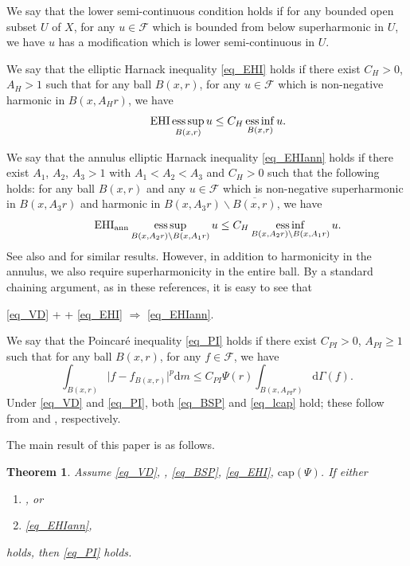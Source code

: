 \documentclass[11pt,a4paper]{article}
\numberwithin{equation}{section}
\newcommand{\esup}{\operatorname*{ess\,sup}}
\newcommand{\einf}{\operatorname*{ess\,inf}}
\theoremstyle{plain}
\newtheorem{theorem}{Theorem}[section]
\theoremstyle{definition}
\begin{document}
We say that the lower semi-continuous condition \hypertarget{eq_LSC}{} holds if for any bounded open subset $U$ of $X$, for any $u\in \mathcal{F}$ which is bounded from below superharmonic in $U$, we have $u$ has a modification which is lower semi-continuous in $U$.

We say that the elliptic Harnack inequality \ref{eq_EHI} holds if there exist $C_H>0$, $A_H>1$ such that for any ball $B(x,r)$, for any $u\in\mathcal{F}$ which is non-negative harmonic in $B(x,A_Hr)$, we have
\begin{equation*}\label{eq_EHI}\tag*{\text{EHI}}
\esup_{B(x,r)}u\le C_H\einf_{B(x,r)}u.
\end{equation*}

We say that the annulus elliptic Harnack inequality \ref{eq_EHIann} holds if there exist $A_1$, $A_2$, $A_3>1$ with $A_1<A_2<A_3$ and $C_H>0$ such that the following holds: for any ball $B(x,r)$ and any $u\in \mathcal{F}$ which is non-negative superharmonic in $B(x,A_3r)$ and harmonic in $B(x,A_3r)\backslash \overline{B(x,r)}$, we have
\begin{equation*}\label{eq_EHIann}\tag*{$\text{EHI}_{\text{ann}}$}
\esup_{B(x,A_2r)\backslash B(x,A_1r)}u\le C_H\einf_{B(x,A_2r)\backslash B(x,A_1r)}u.
\end{equation*}
See also \cite[Theorem 3.1]{Bla01} and \cite[LEMMA 6.3]{GS05} for similar results. However, in addition to harmonicity in the annulus, we also require superharmonicity in the entire ball. By a standard chaining argument, as in these references, it is easy to see that
\begin{center}
\ref{eq_VD} + \hyperlink{eq_LLC}{} + \ref{eq_EHI} $\Rightarrow$ \ref{eq_EHIann}.
\end{center}

We say that the Poincar\'e inequality \ref{eq_PI} holds if there exist $C_{PI}>0$, $A_{PI}\ge1$ such that for any ball $B(x,r)$, for any $f\in\mathcal{F}$, we have
\begin{equation*}\label{eq_PI}\tag*{PI($\Psi$)}
\int_{B(x,r)}\lvert f-f_{B(x,r)}\rvert^p\mathrm{d} m\le C_{PI}\Psi(r)\int_{{B(x,A_{PI}r)}}\mathrm{d}\Gamma(f).
\end{equation*}
Under \ref{eq_VD} and \ref{eq_PI}, both \ref{eq_BSP} and \ref{eq_lcap} hold; these follow from \cite[Lemma 4.1]{Yan25c} and \cite[Lemma 5.1 (a)]{BB04}, respectively.

The main result of this paper is as follows.

\begin{theorem}\label{thm_main}
Assume \ref{eq_VD}, \hyperlink{eq_LSC}{}, \ref{eq_BSP}, \ref{eq_EHI}, \hyperlink{eq_cap}{$\text{cap}(\Psi)$}. If either
\begin{enumerate}[label=(\alph*),ref=(\alph*)]
\item\label{cond_main_LLC} \hyperlink{eq_LLC}{}, or
\item\label{cond_main_EHIann} \ref{eq_EHIann},
\end{enumerate}
holds, then \ref{eq_PI} holds.
\end{theorem}
\end{document}
